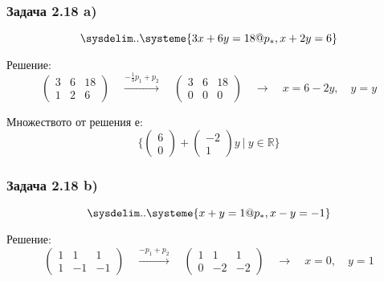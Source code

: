 \documentclass{subfiles}
\begin{document}
\subsubsection{Задача 2.18 a)}

\begin{equation*}
    \sysdelim..\systeme{
        3x + 6y = 18@p_{*},
        x + 2y = 6
    }
\end{equation*}

\noindent Решение:
\begin{equation*}
    \left(
        \begin{array}{ cc|c }
            3 & 6 & 18 \\
            1 & 2 & 6
        \end{array}
    \right)
    \quad
    \overset{-\frac{1}{3}p_{1}+p_{2}}{\longrightarrow}
    \quad
    \left(
        \begin{array}{ cc|c }
            3 & 6 & 18 \\
            0 & 0 & 0
        \end{array}
    \right)
    \quad
    \longrightarrow
    \quad
    x = 6 - 2y,\quad y = y
\end{equation*}

\noindent Множеството от решения е:
\begin{equation*}
    \{
        \left(\begin{array}{ c } 6 \\ 0 \end{array}\right) +
        \left(\begin{array}{ c } -2 \\ 1 \end{array}\right) y
        \ |\ y \in \mathbb{R}
    \}
\end{equation*}

\subsubsection{Задача 2.18 b)}

\begin{equation*}
    \sysdelim..\systeme{
        x + y = 1@p_{*},
        x - y = -1
    }
\end{equation*}

\noindent Решение:
\begin{equation*}
    \left(
        \begin{array}{ cc|c }
            1 & 1 & 1 \\
            1 & -1 & -1
        \end{array}
    \right)
    \quad
    \overset{-p_{1}+p_{2}}{\longrightarrow}
    \quad
    \left(
        \begin{array}{ cc|c }
            1 & 1 & 1 \\
            0 & -2 & -2
        \end{array}
    \right)
    \quad
    \longrightarrow
    \quad
    x = 0,\quad y = 1
\end{equation*}
\end{document}
